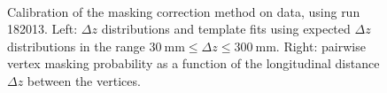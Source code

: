 \begin{enumerate}
\begin{figure}[htbp]
	\centering
	\\
	\caption{Calibration of the masking correction method on data, using run 182013. Left: $\Delta z$ distributions and template fits using expected $\Delta z$ distributions in the range $\SI{30}{\milli\meter}\leq\Delta z\leq\SI{300}{\milli\meter}$. Right: pairwise vertex masking probability as a function of the longitudinal distance $\Delta z$ between the vertices.}
	\label{fig:masking-correction-data}
\end{figure}


\end{enumerate}
